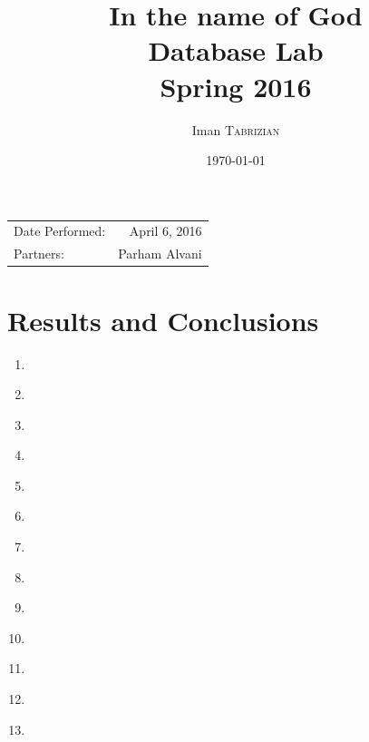\documentclass{article}
\title{In the name of God \\ Database Lab \\ Spring 2016} %
\author{Iman \textsc{Tabrizian}} %
\date{\today} %
\begin{document}
\maketitle %

\begin{center}
	\begin{tabular}{l r}
		Date Performed: & April 6, 2016 \\ %
		Partners: & Parham Alvani \\ %
	\end{tabular}
\end{center}



\section{Results and Conclusions}
\begin{enumerate}
	\item
		\inputminted{sql}{src/im-par-1.sql}
	\item
		\inputminted{sql}{src/im-par-1-a.sql}
	\item
		\inputminted{sql}{src/im-par-1-insert.sql}
	\item
		\inputminted{sql}{src/im-par-2.sql}
	\item
		\inputminted{sql}{src/im-par-2-select.sql}
	\item
		\inputminted{sql}{src/im-par-3.sql}
	\item
		\inputminted{sql}{src/im-par-3-exec.sql}
	\item
		\inputminted{sql}{src/im-par-4.sql}
	\item
		\inputminted{sql}{src/im-par-4-insert-query.sql}
	\item
		\inputminted{sql}{src/im-par-4-select-res.sql}
	\item
		\inputminted{sql}{src/im-par-4-trigger.sql}
	\item
		\inputminted{sql}{src/im-par-5.sql}
	\item
		\inputminted{sql}{src/im-par-5-exec.sql}
\end{enumerate}
\end{document}
